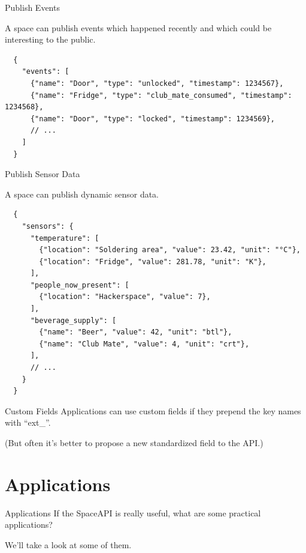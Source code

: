 \begin{frame}[fragile]{Publish Events}

A space can publish events which happened recently and which could be
interesting to the public.

	\begin{verbatim}
  {
    "events": [
      {"name": "Door", "type": "unlocked", "timestamp": 1234567},
      {"name": "Fridge", "type": "club_mate_consumed", "timestamp": 1234568},
      {"name": "Door", "type": "locked", "timestamp": 1234569},
      // ...
    ]
  }
	\end{verbatim}
\end{frame}

\begin{frame}[fragile]{Publish Sensor Data}

A space can publish dynamic sensor data.

	\begin{verbatim}
  {
    "sensors": {
      "temperature": [
        {"location": "Soldering area", "value": 23.42, "unit": "°C"},
        {"location": "Fridge", "value": 281.78, "unit": "K"},
      ],
      "people_now_present": [
        {"location": "Hackerspace", "value": 7},
      ],
      "beverage_supply": [
        {"name": "Beer", "value": 42, "unit": "btl"},
        {"name": "Club Mate", "value": 4, "unit": "crt"},
      ],
      // ...
    }
  }
	\end{verbatim}
\end{frame}

\begin{frame}[fragile]{Custom Fields}
	Applications can use custom fields if they prepend the key names with ``ext\_''.

	(But often it's better to propose a new standardized field to the API.)
\end{frame}


\section{Applications}

\begin{frame}{Applications}
	If the SpaceAPI is really useful, what are some practical applications?

	We'll take a look at some of them.
\end{frame}

